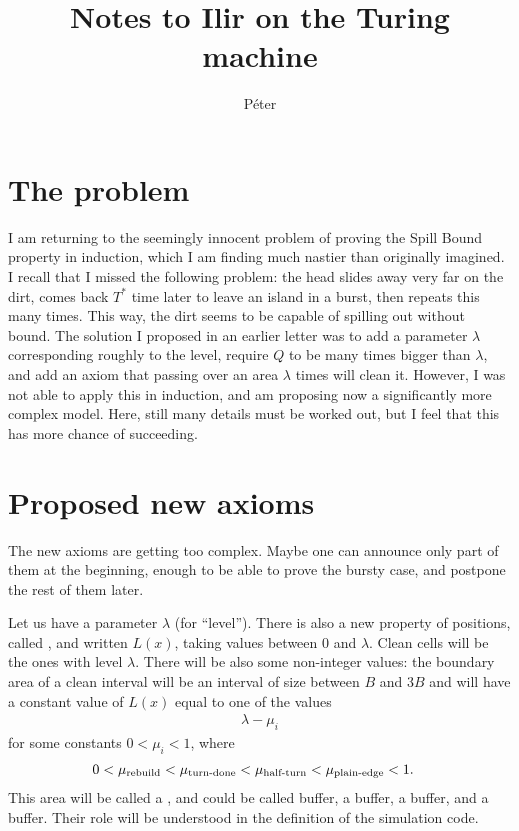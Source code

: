 \documentclass[12pt]{memoir}
\def\B{B}
\newcommand{\Tu}{T}
\newcommand{\Cns}[2]{#1_{\textrm{\upshape #2}}}
\newcommand{\mPlainEdge}{\Cns{\mu}{plain-edge}}
\newcommand{\mHalfTurn}{\Cns{\mu}{half-turn}}
\newcommand{\mTurnDone}{\Cns{\mu}{turn-done}}
\newcommand{\mRebuild}{\Cns{\mu}{rebuild}}
\begin{document}
\title{Notes to Ilir on the Turing machine}

\author{P\'eter}

\maketitle

\section{The problem}

I am returning to the seemingly innocent problem of proving the Spill Bound property
in induction, which I am finding much nastier than originally imagined.
I recall that I missed the following problem: 
the head slides away very far on the dirt, 
comes back \( \Tu^{*} \) time later to leave an island in a burst, 
then repeats this many times.
This way, the dirt seems to be capable of spilling out without bound.
The solution I proposed in an earlier letter was to add a parameter \( \lambda \)
corresponding roughly to the level, require \( Q \) to be many times bigger than \( \lambda \),
and add an axiom that passing over an area \( \lambda \) times will clean it.
However, I was not able to apply this in induction, and am proposing now a significantly
more complex model.
Here, still many details must be worked out, but I feel that this has more chance of succeeding.

\section{Proposed new axioms}

The new axioms are getting too complex.
Maybe one can announce only part of them at the beginning, enough to be
able to prove the bursty case, and postpone the rest of them later.

Let us have a parameter \( \lambda \) (for ``level'').
There is also a new property of positions, called , and written \( L(x) \),
taking values between 0 and \( \lambda \).
Clean cells will be the ones with level \( \lambda \).
There will be also some non-integer values: the boundary area of a clean interval will
be an interval of size between \( \B \) and \( 3\B \) and will have a constant
value of \( L(x) \) equal to one of the values
\begin{align*}
 \lambda-\mu_{i}
 \end{align*}
for some constants \( 0<\mu_{i}<1 \), where
\begin{align*}
     0 &<\mRebuild<\mTurnDone<\mHalfTurn<\mPlainEdge<1.
 \end{align*}
This area will be called a , and could be called  buffer, a  buffer, a
 buffer, and a  buffer.
Their role will be understood in the definition of the simulation code.
\end{document}
